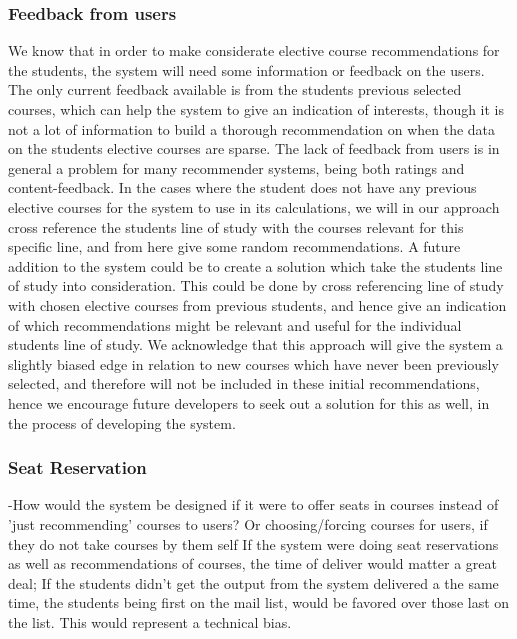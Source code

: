 \subsubsection*{Feedback from users}
We know that in order to make considerate elective course recommendations for the students, the system will need some information or feedback on the users. The only current feedback available is from the students previous selected courses, which can help the system to give an indication of interests, though it is not a lot of information to build a thorough recommendation on when the data on the students elective courses are sparse. The lack of feedback from users is in general a problem for many recommender systems, being both ratings and content-feedback. In the cases where the student does not have any previous elective courses for the system to use in its calculations, we will in our approach cross reference the students line of study with the courses relevant for this specific line, and from here give some random recommendations. A future addition to the system could be to create a solution which take the students line of study into consideration. This could be done by cross referencing line of study with chosen elective courses from previous students, and hence give an indication of which recommendations might be relevant and useful for the individual students line of study. We acknowledge that this approach will give the system a slightly biased edge in relation to new courses which have never been previously selected, and therefore will not be included in these initial recommendations, hence we encourage future developers to seek out a solution for this as well, in the process of developing the system.\newline

\subsubsection*{Seat Reservation}
-How would the system be designed if it were to offer seats in courses instead of 'just recommending' courses to users? Or choosing/forcing courses for users, if they do not take courses by them self \newline
If the system were doing seat reservations as well as recommendations of courses, the time of deliver would matter a great deal; If the students didn't get the output from the system delivered a the same time, the students being first on the mail list, would be favored over those last on the list. This would represent a technical bias. 



